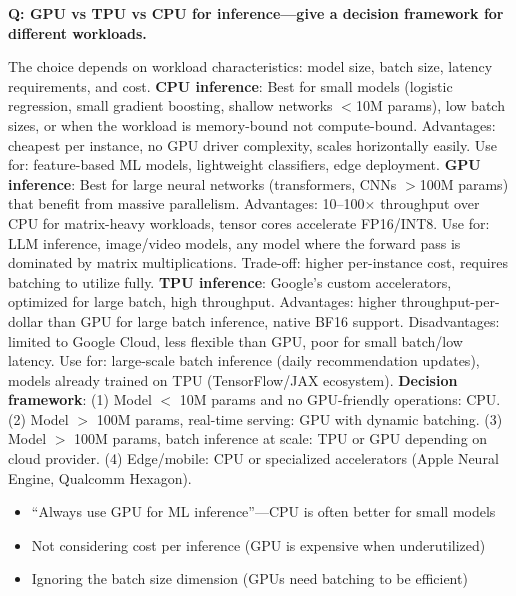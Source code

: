 \begin{interviewq}
\textbf{Q: GPU vs TPU vs CPU for inference---give a decision framework for different workloads.}

 \quad {} \quad \badgefreq{\freqmed}

\stronganswer The choice depends on workload characteristics: model size, batch size, latency requirements, and cost. \textbf{CPU inference}: Best for small models (logistic regression, small gradient boosting, shallow networks $<$10M params), low batch sizes, or when the workload is memory-bound not compute-bound. Advantages: cheapest per instance, no GPU driver complexity, scales horizontally easily. Use for: feature-based ML models, lightweight classifiers, edge deployment. \textbf{GPU inference}: Best for large neural networks (transformers, CNNs $>$100M params) that benefit from massive parallelism. Advantages: 10--100$\times$ throughput over CPU for matrix-heavy workloads, tensor cores accelerate FP16/INT8. Use for: LLM inference, image/video models, any model where the forward pass is dominated by matrix multiplications. Trade-off: higher per-instance cost, requires batching to utilize fully. \textbf{TPU inference}: Google's custom accelerators, optimized for large batch, high throughput. Advantages: higher throughput-per-dollar than GPU for large batch inference, native BF16 support. Disadvantages: limited to Google Cloud, less flexible than GPU, poor for small batch/low latency. Use for: large-scale batch inference (daily recommendation updates), models already trained on TPU (TensorFlow/JAX ecosystem). \textbf{Decision framework}: (1) Model $<$ 10M params and no GPU-friendly operations: CPU. (2) Model $>$ 100M params, real-time serving: GPU with dynamic batching. (3) Model $>$ 100M params, batch inference at scale: TPU or GPU depending on cloud provider. (4) Edge/mobile: CPU or specialized accelerators (Apple Neural Engine, Qualcomm Hexagon).

\redflags
\begin{itemize}
    \item ``Always use GPU for ML inference''---CPU is often better for small models
    \item Not considering cost per inference (GPU is expensive when underutilized)
    \item Ignoring the batch size dimension (GPUs need batching to be efficient)
\end{itemize}



\end{interviewq}
